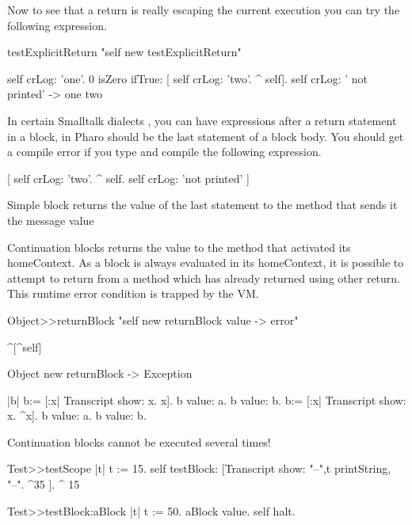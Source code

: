 \documentclass[a4paper,10pt,twoside]{book}
\begin{document}
Now to see that a return is really escaping the current execution you can try the following expression. 

\begin{code}{}
testExplicitReturn
	"self new testExplicitReturn"
	
	self crLog: 'one'.
	0 isZero ifTrue: [ self crLog: 'two'. ^ self].
	self crLog: ' not printed'
-> one two
\end{code}



In certain Smalltalk dialects , you can have expressions after a return statement in a block, in Pharo \ct{^} should be the last statement of a block body. You should get a compile error if you type and compile the following expression. 

\begin{code}{}
[ self crLog: 'two'.
  ^ self.  
  self crLog: 'not printed' ]
\end{code}


Simple block \ct{[:x :y| x*x. x+y]} returns the value of the last statement to the method that sends it the message value

Continuation blocks \ct{[:x :y| ^ x + y]} returns the value to the method that activated its homeContext. As a block is always evaluated in its homeContext, it is possible to attempt to return from a method which has already returned using other return. This runtime error condition is trapped by the VM.

\begin{code}{}
Object>>returnBlock
	"self new returnBlock value -> error"

	^[^self]

Object new returnBlock
-> Exception
\end{code}	
	
	
\begin{code}{}
|b| 
b:= [:x| Transcript show: x. x].
b value: a. b value: b.
b:= [:x| Transcript show: x. ^x].
b value: a. b value: b.
\end{code}
 
Continuation blocks cannot be executed several times!

\begin{code}{}
Test>>testScope
	   |t|
    	t := 15.
	   self testBlock: [Transcript show: "--",t printString, "--".
	   ^35 ].
    ^ 15

Test>>testBlock:aBlock
	   |t|
	   t := 50.
	   aBlock value.
	   self halt.
\end{code}
\end{document}
